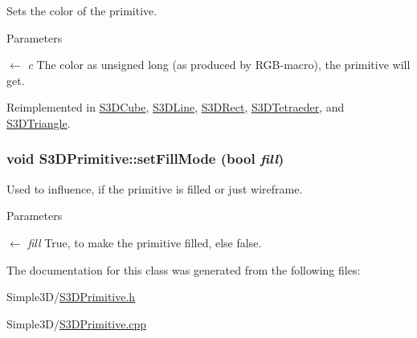 Sets the color of the primitive. 


\begin{DoxyParams}{Parameters}
\item[\mbox{$\leftarrow$} {\em c}]The color as unsigned long (as produced by RGB-\/macro), the primitive will get. \end{DoxyParams}


Reimplemented in \hyperlink{class_s3_d_cube_a9c48875a16cc0ace3a3092e98663b785}{S3DCube}, \hyperlink{class_s3_d_line_a9feaf056477e858a7b0248a7b5cdd222}{S3DLine}, \hyperlink{class_s3_d_rect_af1a976fbe476e7096b2ceded7ab1659c}{S3DRect}, \hyperlink{class_s3_d_tetraeder_a99856377365e5c26c1f86155909725ed}{S3DTetraeder}, and \hyperlink{class_s3_d_triangle_a2c60503c3bae194ec8247a0e2467c915}{S3DTriangle}.

\hypertarget{class_s3_d_primitive_afd54077b1dbe256b9c6dfe67da7b0a0b}{
\subsubsection[{setFillMode}]{\setlength{\rightskip}{0pt plus 5cm}void S3DPrimitive::setFillMode (bool {\em fill})}}
\label{class_s3_d_primitive_afd54077b1dbe256b9c6dfe67da7b0a0b}


Used to influence, if the primitive is filled or just wireframe. 


\begin{DoxyParams}{Parameters}
\item[\mbox{$\leftarrow$} {\em fill}]True, to make the primitive filled, else false. \end{DoxyParams}


The documentation for this class was generated from the following files:\begin{DoxyCompactItemize}
\item 
Simple3D/\hyperlink{_s3_d_primitive_8h}{S3DPrimitive.h}\item 
Simple3D/\hyperlink{_s3_d_primitive_8cpp}{S3DPrimitive.cpp}\end{DoxyCompactItemize}
